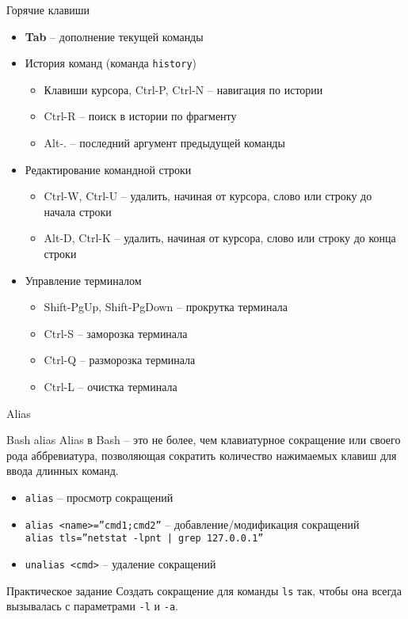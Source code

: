 \begin{frame}{Горячие клавиши}
  \begin{itemize}
    \item \textbf{Tab} -- дополнение текущей команды
      \pause
    \item История команд (команда {\tt history})
      \begin{itemize}
        \item Клавиши курсора, Ctrl-P, Ctrl-N -- навигация по истории
        \item Ctrl-R -- поиск в истории по фрагменту
        \item Alt-.  -- последний аргумент предыдущей команды
      \end{itemize}
    \item Редактирование командной строки
      \begin{itemize}
        \item Ctrl-W, Ctrl-U -- удалить, начиная от курсора, слово или строку до начала строки
        \item Alt-D, Ctrl-K -- удалить, начиная от курсора, слово или строку до конца строки
      \end{itemize}
    \item Управление терминалом
      \begin{itemize}
        \item Shift-PgUp, Shift-PgDown -- прокрутка терминала
        \item Ctrl-S -- заморозка терминала
        \item Ctrl-Q -- разморозка терминала
        \item Ctrl-L -- очистка терминала
      \end{itemize}
  \end{itemize}
\end{frame}

\begin{frame}{Alias}
  \begin{block}{Bash alias}
    Alias в Bash -- это не более, чем клавиатурное сокращение или своего рода аббревиатура, 
    позволяющая сократить количество нажимаемых клавиш для ввода длинных команд.

    \begin{itemize}
        \item {\tt alias} -- просмотр сокращений
	\item {\tt alias <name>=''cmd1;cmd2''} -- добавление/модификация сокращений \\
	      {\tt alias tls=''netstat -lpnt | grep 127.0.0.1''}
        \item {\tt unalias <cmd>} -- удаление сокращений
    \end{itemize}
  \end{block}

  \pause
  \begin{block}{Практическое задание}
  Создать сокращение для команды {\tt ls} так, чтобы она всегда вызывалась с параметрами {\tt -l} и {\tt -a}.
  \end{block}

\end{frame}
